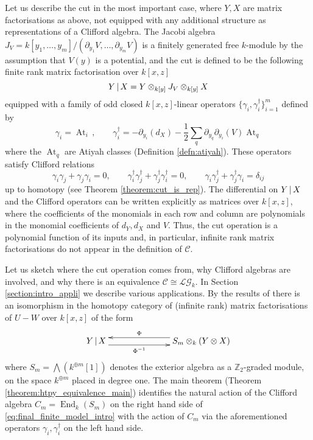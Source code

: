 \documentclass[english,letter paper,12pt,leqno]{article}
\theoremstyle{example}
\numberwithin{equation}{section}
\def\LG{\mathcal{LG}}
\def\be{\begin{equation}}
\def\ee{\end{equation}}
\def\nZ{\mathds{Z}}
\def\L{\mathcal{C}}
\def\ferm{\gamma}
\def\fermc{\gamma^\dagger}
\DeclareMathOperator{\End}{End}
\DeclareMathOperator{\At}{At}
\begin{document}
 Let us describe the cut in the most important case, where $Y, X$ are matrix factorisations as above, not equipped with any additional structure as representations of a Clifford algebra. The Jacobi algebra $J_V = k[y_1,\ldots,y_m]/(\partial_{y_1} V, \ldots, \partial_{y_m} V)$ is a finitely generated free $k$-module by the assumption that $V(y)$ is a potential, and the cut is defined to be the following finite rank matrix factorisation over $k[x,z]$
\be
Y \l X = Y \otimes_{k[y]} J_V \otimes_{k[y]} X
\ee
equipped with a family of odd closed $k[x,z]$-linear operators $\{\ferm_i, \fermc_i\}_{i=1}^m$ defined by
\begin{equation}\label{eq:intro_clifford_act1_intro}
\ferm_i = \At_i\,, \qquad \fermc_i = - \partial_{y_i}(d_X) - \frac{1}{2} \sum_q \partial_{y_q} \partial_{y_i}(V) \At_{q}
\end{equation}
where the $\At_q$ are Atiyah classes (Definition \ref{defn:atiyah}). These operators satisfy Clifford relations
\be\label{eq:clifford_relations_intro}
\ferm_i \ferm_j + \ferm_j \ferm_i = 0, \qquad \fermc_i \fermc_j + \fermc_j \fermc_i = 0, \qquad \ferm_i \fermc_j + \fermc_j \ferm_i = \delta_{ij}
\ee
up to homotopy (see Theorem \ref{theorem:cut_is_rep}). The differential on $Y \,|\, X$ and the Clifford operators can be written explicitly as matrices over $k[x,z]$, where the coefficients of the monomials in each row and column are polynomials in the monomial coefficients of $d_Y, d_X$ and $V$. Thus, the cut operation is a polynomial function of its inputs and, in particular, infinite rank matrix factorisations do not appear in the definition of $\L$.

Let us sketch where the cut operation comes from, why Clifford algebras are involved, and why there is an equivalence $\L \cong \LG_k$. In Section \ref{section:intro_appli} we describe various applications. By the results of \cite{dm1102.2957} there is an isomorphism in the homotopy category of (infinite rank) matrix factorisations of $U - W$ over $k[x,z]$ of the form
\begin{equation}\label{eq:final_finite_model_intro}
\xymatrix@C+4pc{
Y \l X \ar@<-1ex>[r]_-{\Phi^{-1}} & S_m \otimes_{k} ( Y \otimes X )\ar@<-1ex>[l]_-{\Phi}
}
\end{equation}
where $S_m = \bigwedge ( k^{\oplus m}[1] )$ denotes the exterior algebra as a $\nZ_2$-graded module, on the space $k^{\oplus m}$ placed in degree one. The main theorem (Theorem \ref{theorem:htpy_equivalence_main}) identifies the natural action of the Clifford algebra $C_m = \End_{k}(S_m)$ on the right hand side of \eqref{eq:final_finite_model_intro} with the action of $C_m$ via the aforementioned operators $\ferm_i, \fermc_i$ on the left hand side.
\end{document}
